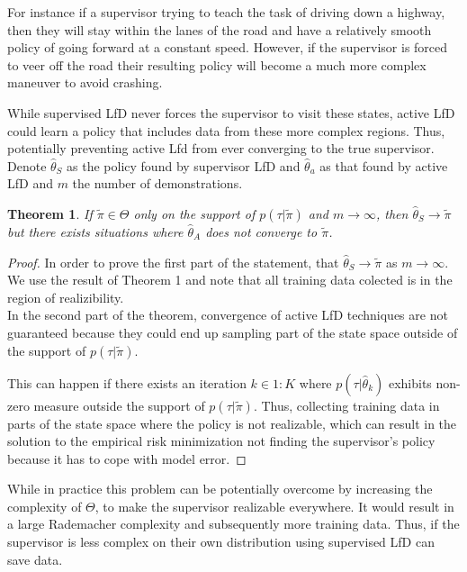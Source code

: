 \documentclass[10pt, conference]{ieeeconf}      %
\newtheorem{theorem}{Theorem}[section]
\begin{document}
For instance if a supervisor trying to teach the task of driving down a highway, then they will stay within the lanes of the road and have a relatively smooth policy of going forward at a constant speed. However, if the supervisor is forced to veer off the road their resulting policy will become a much more complex maneuver to avoid crashing. 

While supervised LfD never forces the supervisor to visit these states, active LfD  could learn a  policy that includes data from these more complex regions. Thus, potentially preventing active Lfd from ever converging to the true supervisor. Denote $\hat{\theta}_S$ as the policy found by supervisor LfD and $\hat{\theta}_a$ as that found by active LfD and $m$ the number of demonstrations. \\

\begin{theorem}
If $\tilde{\pi} \in \Theta$ only on the support of $p(\tau|\tilde{\pi})$ and $m\rightarrow \infty$, then $\hat{\theta}_S \rightarrow \tilde{\pi}$ but there exists situations where $\hat{\theta}_A$ does not converge to $\tilde{\pi}$.\\
\end{theorem}

\begin{proof}
In order to prove the first part of the statement, that $\hat{\theta}_S \rightarrow \tilde{\pi}$ as  $m \rightarrow \infty$. We  use the result of Theorem 1 and note that all training data colected is in the region of realizibility.\\ 

In the second part of the theorem, convergence of active LfD techniques are not guaranteed because they could end up sampling part of the state space outside of the support of $p(\tau|\tilde{\pi})$.

This can happen if there exists an iteration $k \in 1:K$ where $p(\tau | \hat{\theta}_k)$ exhibits non-zero measure outside the support of $p(\tau |\tilde{\pi})$. Thus, collecting training data in parts of the state space where the policy is not realizable, which can result in the solution to the empirical risk minimization not finding the supervisor's policy because it has to cope with model error. 

\end{proof}

While in practice this problem can be potentially overcome by increasing the complexity of $\Theta$, to make the supervisor realizable everywhere. It would result in a large Rademacher complexity and subsequently more training data. Thus, if the supervisor is less complex on their own distribution using supervised LfD can save data. 
\end{document}
